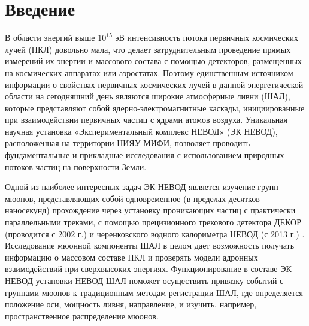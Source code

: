 \chapter*{Введение}
\label{ch:intro}

     В области энергий выше $10^{15}$ эВ интенсивность потока первичных космических лучей (ПКЛ) довольно мала, что делает затруднительным проведение прямых измерений их энергии и массового состава с помощью детекторов, размещенных на космических аппаратах или аэростатах. Поэтому единственным источником информации о свойствах первичных космических лучей в данной энергетической области на сегодняшний день являются широкие атмосферные ливни (ШАЛ), которые представляют собой ядерно-электромагнитные каскады, инициированные при взаимодействии первичных частиц с ядрами атомов воздуха.
     Уникальная научная установка «Экспериментальный комплекс НЕВОД» (ЭК НЕВОД), расположенная на территории НИЯУ МИФИ, позволяет проводить фундаментальные и прикладные исследования с использованием природных потоков частиц на поверхности Земли. 
     
	Одной из наиболее интересных задач ЭК НЕВОД является изучение групп мюонов, представляющих собой одновременное (в пределах десятков наносекунд) прохождение через установку проникающих частиц с практически параллельными треками, с помощью прецизионного трекового детектора ДЕКОР (проводится с 2002 г.) \cite{bogdanov2010investigation, kokoulin2021muon} и черенковского водного калориметра НЕВОД (с 2013 г.) \cite{yurina2021measurements}. Исследование мюонной компоненты ШАЛ в целом дает возможность получать информацию о массовом составе ПКЛ и проверять модели адронных взаимодействий при сверхвысоких энергиях. Функционирование в составе ЭК НЕВОД установки НЕВОД-ШАЛ поможет осуществить привязку событий с группами мюонов к традиционным методам регистрации ШАЛ, где определяется положение оси, мощность ливня, направление, и изучить, например, пространственное распределение мюонов.
    



\endinput